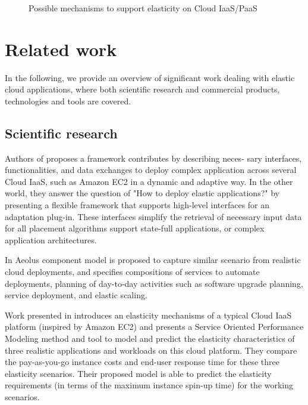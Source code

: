 \documentclass{sig-alternate}
\begin{document}
\begin{figure*}
\centering
{}
\caption{Possible mechanisms to support elasticity on Cloud IaaS/PaaS ~\cite{vaquero2011dynamically}}
\label{fig:scalabilitymechanisms}
\end{figure*}

\section{Related work}
\label{sec:rw}
In the following, we provide an overview of significant work dealing with elastic cloud applications, where both scientific research and commercial products, technologies and tools are covered.

\subsection{Scientific research}
\label{sec:scientific}
Authors of \cite{keller2013topology} proposes a framework contributes by describing neces-
sary interfaces, functionalities, and data exchanges to deploy complex application across several Cloud IaaS, such as Amazon EC2 in a dynamic and adaptive way. In the other world, they answer the question of "How to deploy elastic applications?" by presenting a flexible framework that supports high-level interfaces for an adaptation plug-in. These interfaces simplify the retrieval of necessary input data for all placement algorithms support state-full applications, or complex application architectures.

In \cite{di2012towards} Aeolus component model is proposed to capture similar scenario from realistic cloud deployments, and specifies compositions of services to automate deployments, planning of day-to-day activities such as software upgrade planning, service deployment, and elastic scaling.

Work presented in \cite{brebner2012your} introduces an elasticity mechanisms of a typical Cloud IaaS platform (inspired by Amazon EC2) and presents a Service Oriented Performance Modeling method and tool to model and predict the elasticity characteristics of three realistic applications and workloads on this cloud platform. They compare the pay-as-you-go instance costs and end-user response time for these three elasticity scenarios. Their proposed model is able to predict the elasticity requirements (in terms of the maximum instance spin-up time) for the working scenarios.
\end{document}
